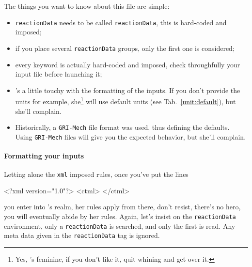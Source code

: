 The things you want to know about this file are simple:
\begin{itemize}
\item \verb!reactionData! needs to be called \verb!reactionData!, 
        this is hard-coded and imposed;
\item if you place several \verb!reactionData! groups, only the first
        one is considered;
\item every keyword is actually hard-coded and imposed, check
        throughfully your input file before launching it;
\item \Antioch's a little touchy with the formatting of the inputs.
        If you don't provide the units for example, she\footnote{Yes, \Antioch's feminine,
        if you don't like it, quit whining and get over it.} will use
        default units (see Tab.~\ref{unit:default}), but she'll complain.
\item Historically, a \verb!GRI-Mech! file format was used, thus defining
        the defaults. Using \verb!GRI-Mech! files will give you the expected
        behavior, but she'll complain.
\end{itemize}

\paragraph{Formatting your inputs}

Letting alone the \verb!xml! imposed rules, once you've put
the lines
\begin{xml}
<?xml version="1.0"?>
<ctml>
</ctml>
\end{xml}
you enter into \Antioch's realm, her rules apply from there, don't
resist, there's no hero, you will eventually abide by her rules.
Again, let's insist on the \verb!reactionData! environment, only
a \verb!reactionData! is searched, and only the first is read.
Any meta data given in the \verb!reactionData! tag is ignored.

